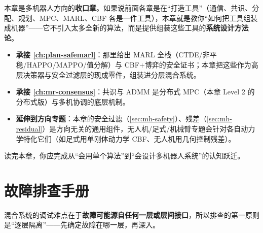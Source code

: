 本章是多机器人方向的\textbf{收口章}。如果说前面各章是在“打造工具”（通信、共识、分配、规划、MPC、MARL、CBF 各是一件工具），本章就是教你“如何把工具组装成机器”——它不引入太多全新的算法，而是提供组装这些工具的\textbf{系统设计方法论}。
\begin{itemize}
  \item \textbf{承接 \cref{ch:plan-safemarl}}：那里给出 MARL 全栈（CTDE/非平稳/HAPPO/MAPPO/值分解）与 CBF$+$博弈的安全证书；本章把这些作为高层决策器与安全过滤层的现成零件，组装进分层混合系统。
  \item \textbf{承接 \cref{ch:mr-consensus}}：共识与 ADMM 是分布式 MPC（本章 Level 2 的分布式版）与多机协调的底层机制。
  \item \textbf{延伸到方向专题}：本章的安全过滤（\cref{sec:mh-safety}）、残差（\cref{sec:mh-residual}）是方向无关的通用组件，无人机/足式/机械臂专题会针对各自动力学特化它们（如足式用单刚体动力学 CBF、无人机用几何控制残差）。
\end{itemize}
读完本章，你应完成从“会用单个算法”到“会设计多机器人系统”的认知跃迁。

\section*{故障排查手册}

混合系统的调试难点在于\textbf{故障可能源自任何一层或层间接口}，所以排查的第一原则是“逐层隔离”——先确定故障在哪一层，再深入。

